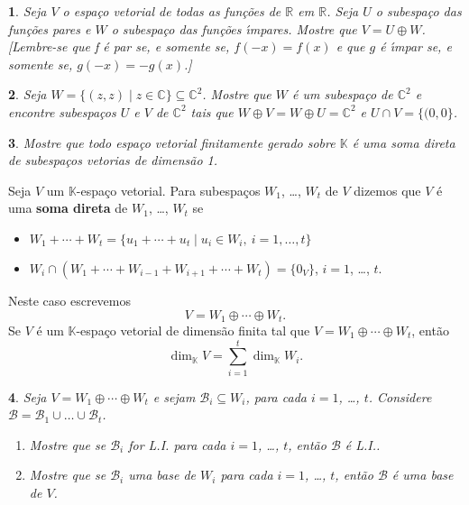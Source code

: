 \documentclass[12pt]{exam}
\newtheorem{exercicio}{}
\newcommand{\sub}{\subseteq}
\newcommand{\real}{\mathbb{R}}
\newcommand{\complex}{\mathbb{C}}
\newcommand{\cp}[1]{\mathbb{#1}}
\begin{document}
\begin{exercicio}
  Seja $V$ o espa\c{c}o vetorial de todas as fun\c{c}\~oes de $\real$ em $\real$. Seja $U$ o subespa\c{c}o das fun\c{c}\~oes pares e $W$ o subespa\c{c}o das fun\c{c}\~oes {\'\i}mpares. Mostre que $V = U \oplus W$. [Lembre-se que f \'e par se, e somente se, $f(-x) = f(x)$ e que $g$ \'e {\'\i}mpar se, e somente se, $g(-x) = -g(x)$.]
\end{exercicio}

\begin{exercicio}
  Seja $W = \{(z,z) \mid z \in \complex\} \sub \complex^2$. Mostre que $W$ \'e um subespa\c{c}o de $\complex^2$ e encontre subespa\c{c}os $U$ e $V$ de $\complex^2$ tais que $W \oplus V = W \oplus U = \complex^2$ e $U \cap V = \{(0,0\}$.
\end{exercicio}

\begin{exercicio}
  Mostre que todo espa\c{c}o vetorial finitamente gerado sobre $\cp{K}$ \'e uma soma direta de subespa\c{c}os vetorias de dimens\~ao 1.
\end{exercicio}


  Seja $V$ um $\cp{K}$-espa\c{c}o vetorial. Para subespa\c{c}os $W_1$, \dots, $W_t$ de $V$ dizemos que $V$ \'e uma \textbf{soma direta} de $W_1$, \dots, $W_t$ se
  \begin{itemize}
    \item $W_1 + \cdots + W_t = \{u_1 + \cdots + u_t \mid u_i \in W_i,\ i = 1,\dots, t\}$
    \item $W_i \cap (W_1 + \cdots + W_{i - 1} + W_{i + 1} + \cdots + W_t) = \{0_V\}$, $i = 1$, \dots, $t$.
  \end{itemize}
  Neste caso escrevemos
  \[
      V = W_1 \oplus \cdots \oplus W_t.
  \]
  Se $V$ \'e um $\cp{K}$-espa\c{c}o vetorial de dimens\~ao finita tal que $V = W_1 \oplus \cdots \oplus W_t$, ent\~ao
  \[
      \dim_\cp{K}V = \sum_{i = 1}^t\dim_\cp{K}W_i.
  \]

\begin{exercicio}
  Seja $V = W_1 \oplus \cdots \oplus W_t$ e sejam $\mathcal{B}_i \sub W_i$, para cada $i = 1$, \dots, $t$. Considere $\mathcal{B} = \mathcal{B}_1 \cup \dots \cup \mathcal{B}_t$.
  \begin{enumerate}[label=({\alph*})]
    \item Mostre que se $\mathcal{B}_i$ for L.I. para cada $i = 1$, \dots, $t$, ent\~ao $\mathcal{B}$ \'e L.I..
    \item Mostre que se $\mathcal{B}_i$ uma base de $W_i$ para cada $i = 1$, \dots, $t$, ent\~ao $\mathcal{B}$ \'e uma base de $V$.
  \end{enumerate}
\end{exercicio}
\end{document}
